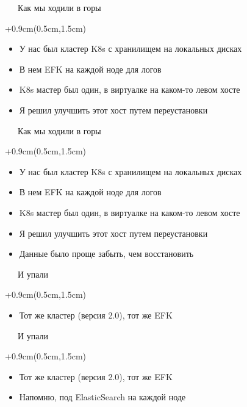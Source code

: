 \documentclass[xetex,18pt,aspectratio=43]{beamer}
\begin{document}
\begin{Large}
\begin{frame}{\ \ \ Как мы ходили в горы}
\begin{textblock*}{\framewidth+0.9cm}(0.5cm,1.5cm)
\begin{itemize}
  \item У нас был кластер K8s с хранилищем на локальных дисках
  \item В нем EFK на каждой ноде для логов
  \item K8s мастер был один, в виртуалке на каком-то левом хосте
  \item Я решил улучшить этот хост путем переустановки
\end{itemize}
\end{textblock*}
\end{frame}

\begin{frame}{\ \ \ Как мы ходили в горы}
\begin{textblock*}{\framewidth+0.9cm}(0.5cm,1.5cm)
\begin{itemize}
  \item У нас был кластер K8s с хранилищем на локальных дисках
  \item В нем EFK на каждой ноде для логов
  \item K8s мастер был один, в виртуалке на каком-то левом хосте
  \item Я решил улучшить этот хост путем переустановки
  \item Данные было проще забыть, чем восстановить
\end{itemize}
\end{textblock*}
\end{frame}

\begin{frame}{\ \ \ И упали}
\begin{textblock*}{\framewidth+0.9cm}(0.5cm,1.5cm)
\begin{itemize}
  \item Тот же кластер (версия 2.0), тот же EFK
\end{itemize}
\end{textblock*}
\end{frame}

\begin{frame}{\ \ \ И упали}
\begin{textblock*}{\framewidth+0.9cm}(0.5cm,1.5cm)
\begin{itemize}
  \item Тот же кластер (версия 2.0), тот же EFK
  \item Напомню, под ElasticSearch на каждой ноде
\end{itemize}
\end{textblock*}
\end{frame}


\end{Large}
\end{document}
